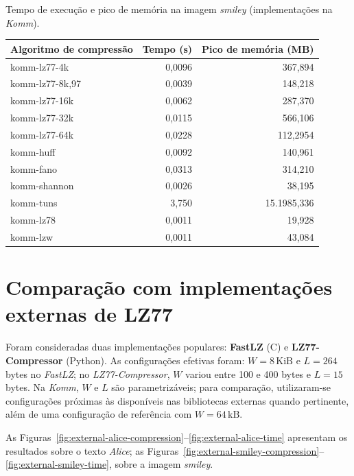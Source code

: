 \begin{quadro}[htp]
\caption{Tempo de execução e pico de memória na imagem \textit{smiley} (implementações na \textit{Komm}).}\label{quadro:resultados-komm-smiley}
\begin{tabular}{|l|r|r|}
    \hline
    \textbf{Algoritmo de compressão} & \textbf{Tempo (s)} & \textbf{Pico de memória (MB)} \\
    \hline
    komm-lz77-4k   & 0,0096 & 367,894  \\ \hline
    komm-lz77-8k,97 & 0,0039 & 148,218  \\ \hline
    komm-lz77-16k  & 0,0062 & 287,370  \\ \hline
    komm-lz77-32k  & 0,0115 & 566,106  \\ \hline
    komm-lz77-64k  & 0,0228 & 112,2954 \\ \hline
    komm-huff      & 0,0092 & 140,961  \\ \hline
    komm-fano      & 0,0313 & 314,210  \\ \hline
    komm-shannon   & 0,0026 & 38,195   \\ \hline
    komm-tuns      & 3,750  & 15.1985,336 \\ \hline
    komm-lz78      & 0,0011 & 19,928   \\ \hline
    komm-lzw       & 0,0011 & 43,084   \\ \hline
\end{tabular}
\end{quadro}

\pagebreak
\pagebreak
\pagebreak

\section{Comparação com implementações externas de LZ77}\label{sec:externas}

Foram consideradas duas implementações populares: \textbf{FastLZ} (C) e \textbf{LZ77-Compressor} (Python). As configurações efetivas foram: \(W=8\,\text{KiB}\) e \(L=264\) bytes no \textit{FastLZ}; no \textit{LZ77-Compressor}, \(W\) variou entre 100 e 400 bytes e \(L=15\) bytes. Na \textit{Komm}, \(W\) e \(L\) são parametrizáveis; para comparação, utilizaram-se configurações próximas às disponíveis nas bibliotecas externas quando pertinente, além de uma configuração de referência com \(W=64\,\text{kB}\).

As Figuras~\ref{fig:external-alice-compression}–\ref{fig:external-alice-time} apresentam os resultados sobre o texto \textit{Alice}; as Figuras~\ref{fig:external-smiley-compression}–\ref{fig:external-smiley-time}, sobre a imagem \textit{smiley}.


